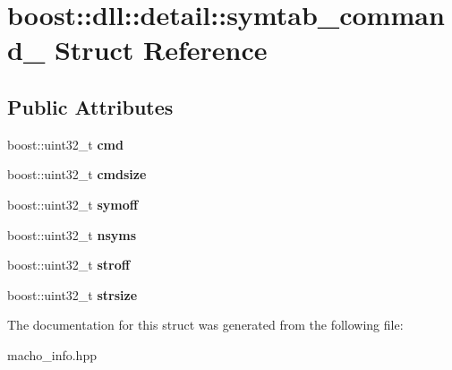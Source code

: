 \hypertarget{a01564}{}\section{boost\+:\+:dll\+:\+:detail\+:\+:symtab\+\_\+command\+\_\+ Struct Reference}
\label{a01564}
\subsection*{Public Attributes}
\begin{DoxyCompactItemize}
\item 
\mbox{\label{a01564_a875314e43c4c3e853fb966fc9a87750c}} 
boost\+::uint32\+\_\+t {\bfseries cmd}
\item 
\mbox{\label{a01564_ad4cf9ed5b556cc0bff31f4a44553151f}} 
boost\+::uint32\+\_\+t {\bfseries cmdsize}
\item 
\mbox{\label{a01564_ad1fdad2d5447938c04767178b1495801}} 
boost\+::uint32\+\_\+t {\bfseries symoff}
\item 
\mbox{\label{a01564_a3b441ff3a1c1fd4c343d4a354731b89e}} 
boost\+::uint32\+\_\+t {\bfseries nsyms}
\item 
\mbox{\label{a01564_a50e91179f578b73547c3fe13ed74b883}} 
boost\+::uint32\+\_\+t {\bfseries stroff}
\item 
\mbox{\label{a01564_ae5eccc05ff40a5d53e4a459d6ac38289}} 
boost\+::uint32\+\_\+t {\bfseries strsize}
\end{DoxyCompactItemize}


The documentation for this struct was generated from the following file\+:\begin{DoxyCompactItemize}
\item 
macho\+\_\+info.\+hpp\end{DoxyCompactItemize}
